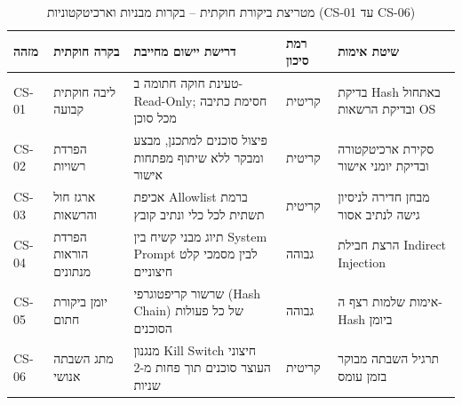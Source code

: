 \begin{table}[htbp]
\centering
\caption{מטריצת ביקורת חוקתית -- בקרות מבניות וארכיטקטוניות (\textenglish{CS-01} עד \textenglish{CS-06})}
\label{tab:const-matrix-structural}
\begin{tabular}{p{1.3cm} p{3.0cm} p{4.2cm} p{2.2cm} p{3.6cm}}
\toprule
\textbf{מזהה} & \textbf{בקרה חוקתית} & \textbf{דרישת יישום מחייבת} & \textbf{רמת סיכון} & \textbf{שיטת אימות} \\
\midrule
\textenglish{CS-01} & ליבה חוקתית קבועה & טעינת חוקה חתומה ב-\textenglish{Read-Only}; חסימת כתיבה מכל סוכן & קריטית & בדיקת \textenglish{Hash} באתחול ובדיקת הרשאות \textenglish{OS} \\
\textenglish{CS-02} & הפרדת רשויות & פיצול סוכנים למתכנן, מבצע ומבקר ללא שיתוף מפתחות אישור & קריטית & סקירת ארכיטקטורה ובדיקת יומני אישור \\
\textenglish{CS-03} & ארגז חול והרשאות & אכיפת \textenglish{Allowlist} ברמת תשתית לכל כלי ונתיב קובץ & קריטית & מבחן חדירה לניסיון גישה לנתיב אסור \\
\textenglish{CS-04} & הפרדת הוראות מנתונים & תיוג מבני קשיח בין \textenglish{System Prompt} לבין מסמכי קלט חיצוניים & גבוהה & הרצת חבילת \textenglish{Indirect Injection} \\
\textenglish{CS-05} & יומן ביקורת חתום & שרשור קריפטוגרפי (\textenglish{Hash Chain}) של כל פעולות הסוכנים & גבוהה & אימות שלמות רצף ה-\textenglish{Hash} ביומן \\
\textenglish{CS-06} & מתג השבתה אנושי & מנגנון \textenglish{Kill Switch} חיצוני העוצר סוכנים תוך פחות מ-2 שניות & קריטית & תרגיל השבתה מבוקר בזמן עומס \\
\bottomrule
\end{tabular}
\end{table}

